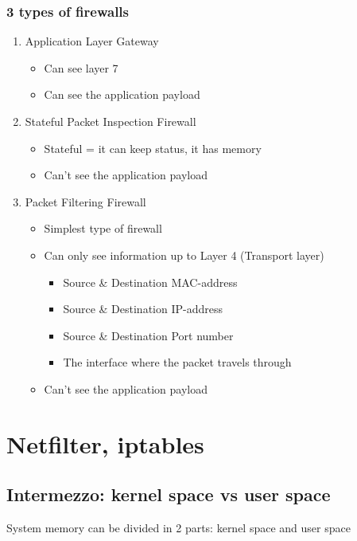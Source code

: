 \documentclass{article}
\begin{document}
\subsubsection{3 types of firewalls}

\begin{enumerate}
    \item Application Layer Gateway
    \begin{itemize}
        \item Can see layer 7
        \item Can see the application payload
    \end{itemize}
    \item Stateful Packet Inspection Firewall
    \begin{itemize}
        \item Stateful = it can keep status, it has memory
        \item Can't see the application payload
    \end{itemize}
    \item Packet Filtering Firewall
    \begin{itemize}
        \item Simplest type of firewall
        \item Can only see information up to Layer 4 (Transport layer)
        \begin{itemize}
            \item Source \& Destination MAC-address
            \item Source \& Destination IP-address
            \item Source \& Destination Port number
            \item The interface where the packet travels through
        \end{itemize}
        \item Can't see the application payload
    \end{itemize}
\end{enumerate}

\section{Netfilter, iptables}

\subsection{Intermezzo: kernel space vs user space}

System memory can be divided in 2 parts: kernel space and user space
\end{document}
